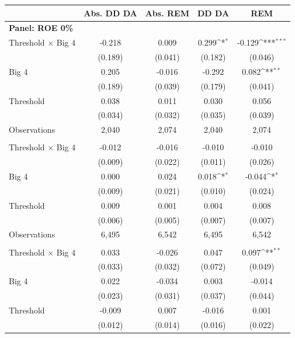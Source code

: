 \documentclass[10pt]{article}
\newcommand{\sym}[1]{\textsuperscript{#1}}
\begin{document}
\begin{minipage}{19cm}\fontsize{10}{12}\selectfont\setlength{\tabcolsep}{4pt}\renewcommand{\arraystretch}{1.15}


\def\sym#1{\ifmmode^{#1}\else\(^{#1}\)\fi}
\centering
{}
\label{tab:big4-roe-threshold-earnings}
\begin{threeparttable}
\begin{tabular}{l c c c c }
\toprule
 & Abs. DD DA & Abs. REM & DD DA & REM \\
\midrule
\multicolumn{5}{l}{\textbf{Panel: ROE 0\%}} \\
Threshold $\times$ Big 4 & -0.218 & 0.009 & 0.299\sym{*} & -0.129\sym{***} \\
 & (0.189) & (0.041) & (0.182) & (0.046) \\
Big 4 & 0.205 & -0.016 & -0.292 & 0.082\sym{**} \\
 & (0.189) & (0.039) & (0.179) & (0.041) \\
Threshold & 0.038 & 0.011 & 0.030 & 0.056 \\
 & (0.034) & (0.032) & (0.035) & (0.039) \\
Observations & 2,040 & 2,074 & 2,040 & 2,074 \\
\addlinespace
\multicolumn{5}{l}{\textbf{Panel: ROE 6\%}} \\
Threshold $\times$ Big 4 & -0.012 & -0.016 & -0.010 & -0.010 \\
 & (0.009) & (0.022) & (0.011) & (0.026) \\
Big 4 & 0.000 & 0.024 & 0.018\sym{*} & -0.044\sym{*} \\
 & (0.009) & (0.021) & (0.010) & (0.024) \\
Threshold & 0.009 & 0.001 & 0.004 & 0.008 \\
 & (0.006) & (0.005) & (0.007) & (0.007) \\
Observations & 6,495 & 6,542 & 6,495 & 6,542 \\
\addlinespace
\multicolumn{5}{l}{\textbf{Panel: ROE 10\%}} \\
Threshold $\times$ Big 4 & 0.033 & -0.026 & 0.047 & 0.097\sym{**} \\
 & (0.033) & (0.032) & (0.072) & (0.049) \\
Big 4 & 0.022 & -0.034 & 0.003 & -0.014 \\
 & (0.023) & (0.031) & (0.037) & (0.044) \\
Threshold & -0.009 & 0.007 & -0.016 & 0.001 \\
 & (0.012) & (0.014) & (0.016) & (0.022) \\

\end{tabular}
\end{threeparttable}
\end{minipage}
\end{document}
